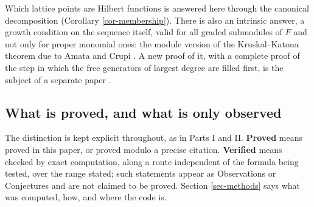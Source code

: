 \documentclass[11pt, a4paper, abstract=yes]{scrartcl}
\theoremstyle{definition}
\theoremstyle{remark}
\theoremstyle{plain}
\theoremstyle{remark}
\theoremstyle{plain}
\begin{document}
Which lattice points are Hilbert functions is answered here through the canonical decomposition
(Corollary \ref{cor-membership}). There is also an intrinsic answer, a growth condition on the
sequence itself, valid for all graded submodules of \(F\) and not only for proper monomial ones:
the module version of the Kruskal--Katona theorem due to Amata and Crupi
\autocite[Theorem 4.2]{AmataCrupi2020KK}. A new proof of it, with a complete proof of the step in which
the free generators of largest degree are filled first, is the subject of a separate paper
\autocite{SnellmanArticle5}.
\subsection{What is proved, and what is only observed}
\label{sec:org779dbe1}

The distinction is kept explicit throughout, as in Parts I and II. \textbf{Proved} means proved in this
paper, or proved modulo a precise citation. \textbf{Verified} means checked by exact computation, along
a route independent of the formula being tested, over the range stated; such statements appear as
Observations or Conjectures and are not claimed to be proved. Section \ref{sec-methods} says what
was computed, how, and where the code is.
\end{document}
